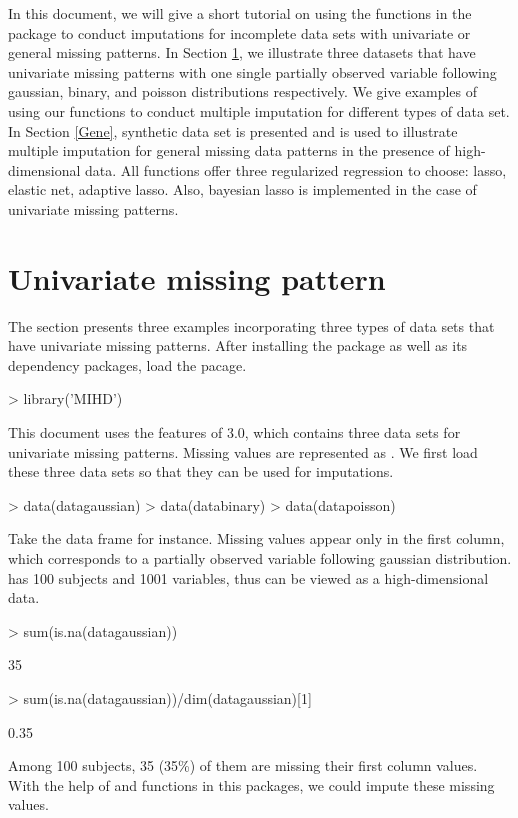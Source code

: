 \documentclass[a4paper]{article}
\begin{document}
In this document, we will give a short tutorial on using the functions in the package to conduct imputations for incomplete data sets with univariate or general missing patterns. In Section \ref{Uni}, we illustrate three datasets that have univariate missing patterns with one single partially observed variable following gaussian, binary, and poisson distributions respectively. We give examples of using our functions to conduct multiple imputation for different types of data set. In Section \ref{Gene}, synthetic data set is presented and is used to illustrate multiple imputation for general missing data patterns in the presence of high-dimensional data. All functions offer three regularized regression to choose: lasso, elastic net, adaptive lasso. Also, bayesian lasso is implemented in the case of univariate missing patterns.

\section{Univariate missing pattern} \label{Uni}
The section presents three examples incorporating three types of data sets that have univariate missing patterns. After installing the \R{} package  as well as its dependency packages, load the pacage.
\begin{Schunk}
\begin{Sinput}
> library('MIHD')
\end{Sinput}
\end{Schunk}
This document uses the features of  3.0, which contains three data sets for univariate missing patterns. Missing values are represented as . We first load these three data sets so that they can be used for imputations.
\begin{Schunk}
\begin{Sinput}
> data(datagaussian)
> data(databinary)
> data(datapoisson)
\end{Sinput}
\end{Schunk}
Take the data frame  for instance. Missing values appear only in the first column, which corresponds to a partially observed variable following gaussian distribution.  has 100 subjects and 1001 variables, thus can be viewed as a high-dimensional data.
\begin{Schunk}
\begin{Sinput}
> sum(is.na(datagaussian))
\end{Sinput}
\begin{Soutput}
[1] 35
\end{Soutput}
\begin{Sinput}
> sum(is.na(datagaussian))/dim(datagaussian)[1]
\end{Sinput}
\begin{Soutput}
[1] 0.35
\end{Soutput}
\end{Schunk}
Among 100 subjects, 35 (35\%) of them are missing their first column values. With the help of  and  functions in this packages, we could impute these missing values.
\end{document}
